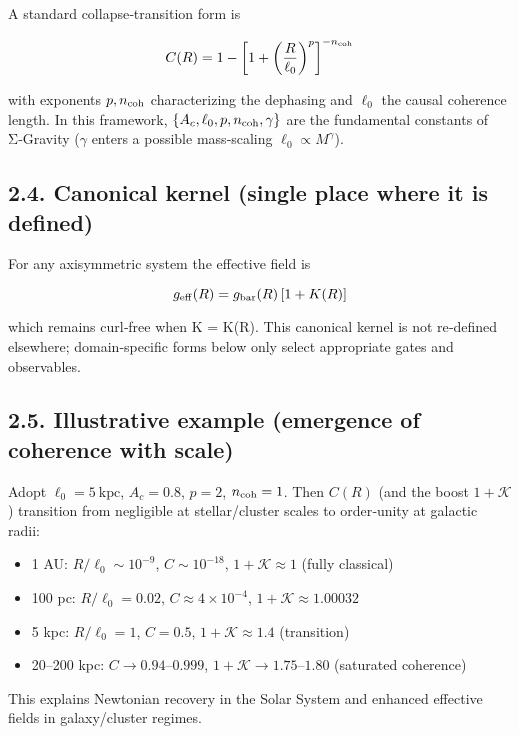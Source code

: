 \documentclass[11pt,a4paper]{article}
\begin{document}
A standard collapse‑transition form is


\begin{equation}
C(R) = 1 - \left[1 + \left(\frac{R}{\ell_0}\right)^p\right]^{-n_{\rm coh}}
\end{equation}


with exponents $p,n_{\rm coh}$ characterizing the dephasing and $\ell_0$ the causal coherence length. In this framework, $\{A_c,\ell_0,p,n_{\rm coh},\gamma\}$ are the fundamental constants of Σ‑Gravity ($\gamma$ enters a possible mass‑scaling $\ell_0\propto M^{\gamma}$).


\subsection{2.4. Canonical kernel (single place where it is defined)}


For any axisymmetric system the effective field is


\begin{equation}
 g_{\rm eff}(R) = g_{\rm bar}(R)\,[1 + K(R)] 
\end{equation}


which remains curl‑free when K = K(R). This canonical kernel is not re‑defined elsewhere; domain‑specific forms below only select appropriate gates and observables.


\subsection{2.5. Illustrative example (emergence of coherence with scale)}


Adopt $\ell_0=5~\mathrm{kpc}$, $A_c=0.8$, $p=2$, $n_{\rm coh}=1$. Then $C(R)$ (and the boost $1+\mathcal{K}$) transition from negligible at stellar/cluster scales to order‑unity at galactic radii:


\begin{itemize}
\item 1 AU: $R/\ell_0\sim10^{-9}$, $C\sim10^{-18}$, $1+\mathcal{K}\approx1$ (fully classical)
\item 100 pc: $R/\ell_0=0.02$, $C\approx4\times10^{-4}$, $1+\mathcal{K}\approx1.00032$
\item 5 kpc: $R/\ell_0=1$, $C=0.5$, $1+\mathcal{K}\approx1.4$ (transition)
\item 20–200 kpc: $C\to0.94\text{–}0.999$, $1+\mathcal{K}\to1.75\text{–}1.80$ (saturated coherence)
\end{itemize}


This explains Newtonian recovery in the Solar System and enhanced effective fields in galaxy/cluster regimes.
\end{document}
